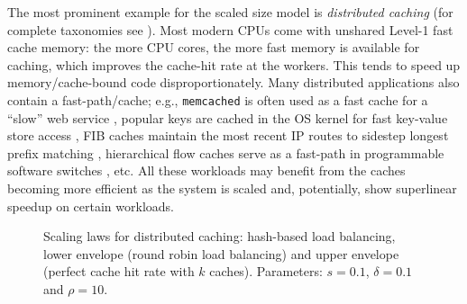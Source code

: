 The most prominent example for the scaled size model is \emph{distributed caching} \cite{scalability-analyzed, sdn-analytitcs, dobb-2} (for complete taxonomies see \cite{556383, 7733347, 80148}).  Most modern CPUs come with unshared Level-1 fast cache memory: the more CPU cores, the more fast memory is available for caching, which improves the cache-hit rate at the workers. This tends to speed up memory\slash cache-bound code disproportionately. Many distributed applications also contain a fast-path\slash cache; e.g., \texttt{memcached} is often used as a fast cache for a ``slow'' web service \cite{180324,10.5555/1012889.1012894}, popular keys are cached in the OS kernel for fast key-value store access \cite{179747, ghigoff2021bmc}, FIB caches maintain the most recent IP routes to sidestep longest prefix matching \cite{rottenstreich2016optimal}, hierarchical flow caches serve as a fast-path in programmable software switches \cite{188960}, etc. All these workloads may benefit from the caches becoming more efficient as the system is scaled and, potentially, show superlinear speedup on certain workloads. %

\begin{figure}
  \centering
  \begin{small}
    
\end{small}
\caption{Scaling laws for distributed caching: hash-based load balancing, lower envelope (round robin load balancing) and upper envelope (perfect cache hit rate with $k$ caches). Parameters: $s=0.1$, $\delta=0.1$ and $\rho=10$.}
  \label{fig:dcache-analysis}
\end{figure}



